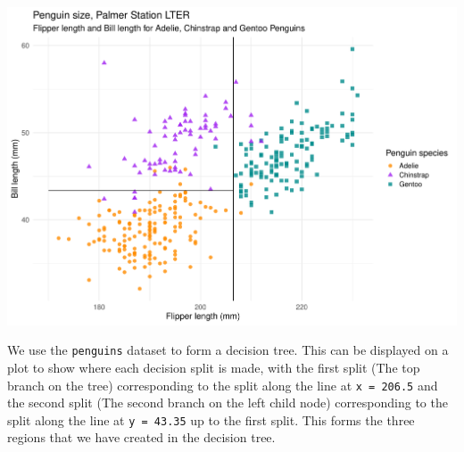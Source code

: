 \documentclass[landscape,a2paper,fontscale=0.833]{baposter}
\begin{document}
\begin{poster}
{\begin{multicols}{2}
\begin{center}
    \includegraphics[width=0.8\linewidth]{presentation/plotpen2.pdf}
    \label{fog:penplot}
\end{center}
\end{multicols}
We use the \texttt{penguins} dataset to form a decision tree. 
This can be displayed on a plot to show where each decision split is made, with the first split (The top branch on the tree) corresponding to the split along the line at \texttt{x = 206.5} and the second split (The second branch on the left child node) corresponding to the split along the line at \texttt{y = 43.35} up to the first split.
This forms the three regions that we have created in the decision tree.
}

\end{poster}
\end{document}
